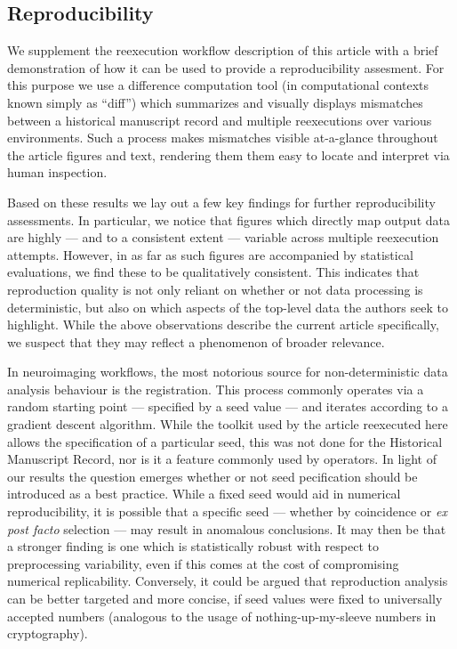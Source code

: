 \subsection{Reproducibility}


We supplement the reexecution workflow description of this article with a brief demonstration of how it can be used to provide a reproducibility assesment.
For this purpose we use a difference computation tool (in computational contexts known simply as “diff”) which summarizes and visually displays mismatches between a historical manuscript record and multiple reexecutions over various environments.
Such a process makes mismatches visible at-a-glance throughout the article figures and text, rendering them them easy to locate and interpret via human inspection.

Based on these results we lay out a few key findings for further reproducibility assessments.
In particular, we notice that figures which directly map output data are highly — and to a consistent extent — variable across multiple reexecution attempts.
However, in as far as such figures are accompanied by statistical evaluations, we find these to be qualitatively consistent.
This indicates that reproduction quality is not only reliant on whether or not data processing is deterministic, but also on which aspects of the top-level data the authors seek to highlight.
While the above observations describe the current article specifically, we suspect that they may reflect a phenomenon of broader relevance.

In neuroimaging workflows, the most notorious source for non-deterministic data analysis behaviour is the registration.
This process commonly operates via a random starting point — specified by a seed value — and iterates according to a gradient descent algorithm.
While the toolkit used by the article reexecuted here allows the specification of a particular seed, this was not done for the Historical Manuscript Record, nor is it a feature commonly used by operators.
In light of our results the question emerges whether or not seed pecification should be introduced as a best practice.
While a fixed seed would aid in numerical reproducibility, it is possible that a specific seed — whether by coincidence or \textit{ex post facto} selection — may result in anomalous conclusions.
It may then be that a stronger finding is one which is statistically robust with respect to preprocessing variability, even if this comes at the cost of compromising numerical replicability.
Conversely, it could be argued that reproduction analysis can be better targeted and more concise, if seed values were fixed to universally accepted numbers (analogous to the usage of nothing-up-my-sleeve numbers in cryptography).

